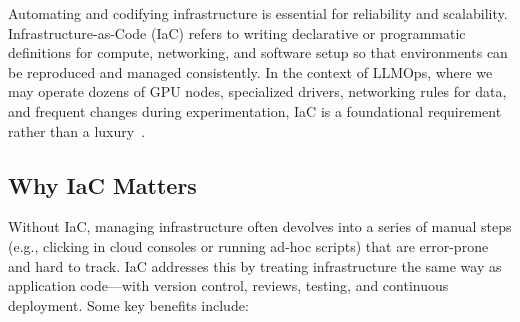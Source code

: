 Automating and codifying infrastructure is essential for reliability and scalability. 
Infrastructure-as-Code (IaC) refers to writing declarative or programmatic definitions for compute, networking, and software setup so that environments can be reproduced and managed consistently. 
In the context of LLMOps, where we may operate dozens of GPU nodes, specialized drivers, networking rules for data, and frequent changes during experimentation, IaC is a foundational requirement rather than a luxury~\cite{terraform-docs,pulumi-docs}.

\subsection{Why IaC Matters}
\label{sec:iac-why}

Without IaC, managing infrastructure often devolves into a series of manual steps (e.g., clicking in cloud consoles or running ad-hoc scripts) that are error-prone and hard to track. 
IaC addresses this by treating infrastructure the same way as application code---with version control, reviews, testing, and continuous deployment. 
Some key benefits include:

